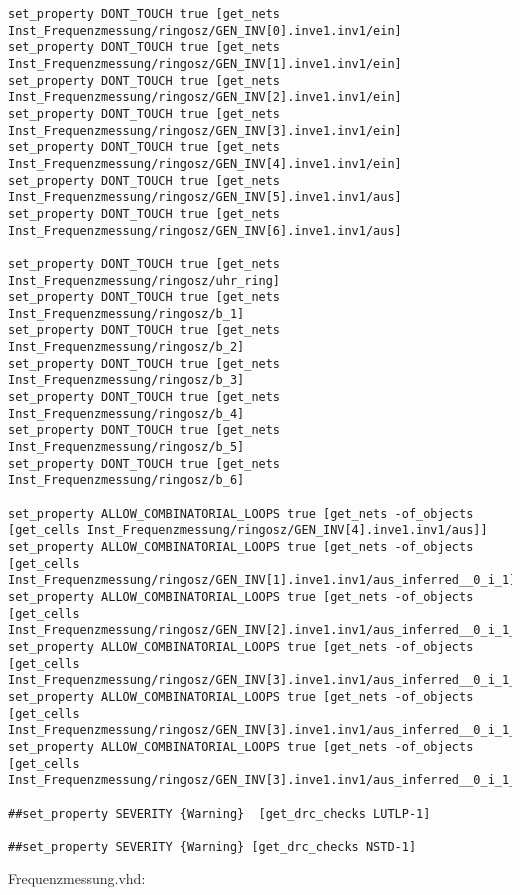 \documentclass{article}
\begin{document}
\begin{verbatim}
set_property DONT_TOUCH true [get_nets Inst_Frequenzmessung/ringosz/GEN_INV[0].inve1.inv1/ein]
set_property DONT_TOUCH true [get_nets Inst_Frequenzmessung/ringosz/GEN_INV[1].inve1.inv1/ein]
set_property DONT_TOUCH true [get_nets Inst_Frequenzmessung/ringosz/GEN_INV[2].inve1.inv1/ein]
set_property DONT_TOUCH true [get_nets Inst_Frequenzmessung/ringosz/GEN_INV[3].inve1.inv1/ein]
set_property DONT_TOUCH true [get_nets Inst_Frequenzmessung/ringosz/GEN_INV[4].inve1.inv1/ein]
set_property DONT_TOUCH true [get_nets Inst_Frequenzmessung/ringosz/GEN_INV[5].inve1.inv1/aus]
set_property DONT_TOUCH true [get_nets Inst_Frequenzmessung/ringosz/GEN_INV[6].inve1.inv1/aus]

set_property DONT_TOUCH true [get_nets Inst_Frequenzmessung/ringosz/uhr_ring]
set_property DONT_TOUCH true [get_nets Inst_Frequenzmessung/ringosz/b_1]
set_property DONT_TOUCH true [get_nets Inst_Frequenzmessung/ringosz/b_2]
set_property DONT_TOUCH true [get_nets Inst_Frequenzmessung/ringosz/b_3]
set_property DONT_TOUCH true [get_nets Inst_Frequenzmessung/ringosz/b_4]
set_property DONT_TOUCH true [get_nets Inst_Frequenzmessung/ringosz/b_5]
set_property DONT_TOUCH true [get_nets Inst_Frequenzmessung/ringosz/b_6]

set_property ALLOW_COMBINATORIAL_LOOPS true [get_nets -of_objects 
[get_cells Inst_Frequenzmessung/ringosz/GEN_INV[4].inve1.inv1/aus]]
set_property ALLOW_COMBINATORIAL_LOOPS true [get_nets -of_objects 
[get_cells Inst_Frequenzmessung/ringosz/GEN_INV[1].inve1.inv1/aus_inferred__0_i_1]]
set_property ALLOW_COMBINATORIAL_LOOPS true [get_nets -of_objects
[get_cells Inst_Frequenzmessung/ringosz/GEN_INV[2].inve1.inv1/aus_inferred__0_i_1__0]]
set_property ALLOW_COMBINATORIAL_LOOPS true [get_nets -of_objects 
[get_cells Inst_Frequenzmessung/ringosz/GEN_INV[3].inve1.inv1/aus_inferred__0_i_1__1]]
set_property ALLOW_COMBINATORIAL_LOOPS true [get_nets -of_objects 
[get_cells Inst_Frequenzmessung/ringosz/GEN_INV[3].inve1.inv1/aus_inferred__0_i_1__2]]
set_property ALLOW_COMBINATORIAL_LOOPS true [get_nets -of_objects 
[get_cells Inst_Frequenzmessung/ringosz/GEN_INV[3].inve1.inv1/aus_inferred__0_i_1__3]]

##set_property SEVERITY {Warning}  [get_drc_checks LUTLP-1]

##set_property SEVERITY {Warning} [get_drc_checks NSTD-1]
\end{verbatim}
Frequenzmessung.vhd:\newline
\end{document}
